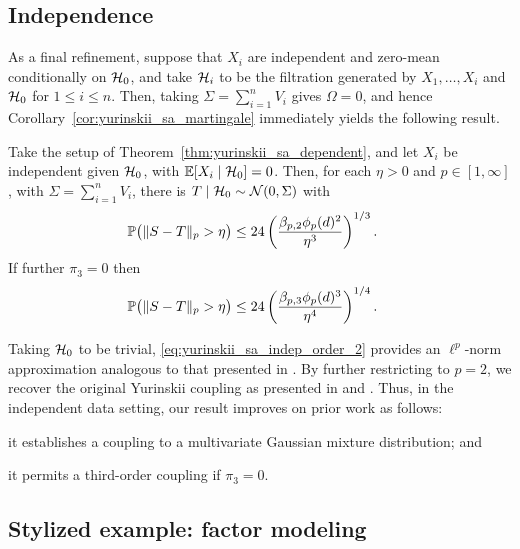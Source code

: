 \subsection{Independence}

As a final refinement, suppose that $X_i$ are independent and
zero-mean conditionally on $\cH_0$,
and take $\cH_i$ to be the filtration
generated by $X_1, \ldots, X_i$ and $\cH_0$ for $1 \leq i \leq n$.
Then, taking $\Sigma = \sum_{i=1}^n V_i$
gives $\Omega = 0$, and hence Corollary~\ref{cor:yurinskii_sa_martingale}
immediately yields the following result.
%
\begin{corollary}%
  \label{cor:yurinskii_sa_indep}

  Take the setup of Theorem~\ref{thm:yurinskii_sa_dependent},
  and let $X_i$ be independent given $\cH_0$,
  with $\E[X_i \mid \cH_0] = 0$.
  Then, for each $\eta > 0$ and $p \in [1,\infty]$,
  with $\Sigma = \sum_{i=1}^n V_i$,
  there is $T \mid \cH_0 \sim \cN(0, \Sigma)$ with
  \begin{align}
    \label{eq:yurinskii_sa_indep_order_2}
    \P\big(\|S-T\|_p > \eta\big)
    &\leq 24 \left( \frac{\beta_{p,2} \phi_p(d)^2}{\eta^3} \right)^{1/3}.
  \end{align}
  If further $\pi_3 = 0$ then
  \begin{align*}
    \P\big(\|S-T\|_p > \eta\big)
    &\leq 24 \left( \frac{\beta_{p,3} \phi_p(d)^3}{\eta^4} \right)^{1/4}.
  \end{align*}
\end{corollary}

Taking $\cH_0$ to be trivial,
\eqref{eq:yurinskii_sa_indep_order_2} provides an $\ell^p$-norm approximation
analogous to that presented in \citet{belloni2019conditional}.
By further
restricting to $p=2$, we recover the original Yurinskii coupling as presented
in \citet[Theorem~1]{lecam1988} and \citet[Theorem~10]{pollard2002user}. Thus,
in the independent data setting, our result improves on prior work as follows:
\begin{inlineroman}
  \item
    it establishes a coupling to a multivariate Gaussian mixture distribution;
    and
  \item
    it permits a third-order coupling if $\pi_3=0$.
\end{inlineroman}

\subsection{Stylized example: factor modeling}
\label{sec:yurinskii_factor}


